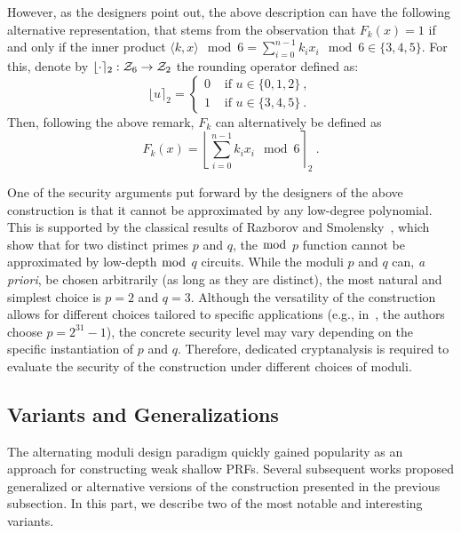 However, as the designers point out, the above description can have the following alternative representation, that stems from the observation that $F_k(x) = 1$ if and only if the inner product $\langle k, x \rangle  \mod{6} = \sum_{i = 0}^{n-1} k_i x_i \mod{6} \in \{3,4,5\}$. For this, denote by $\lfloor \cdot \rceil_2 : \mathcal{Z}_6 \rightarrow \mathcal{Z}_2$ the rounding operator defined as:
\begin{equation*}
\lfloor u \rceil_2 = \left\{
\begin{array}{rl}
0 & \text{ if } u \in \{0,1,2\}~, \\
1 & \text{ if } u \in \{3,4,5\}~.
\end{array}
\right.
\end{equation*}
Then, following the above remark, $F_k$ can alternatively be defined as
 \begin{equation} \label{eq:bipsw}
F_k(x) = \left\lfloor \sum_{i = 0}^{n-1} k_i x_i  \mod{6} \right\rceil_2~.
\end{equation}


One of the security arguments put forward by the designers of the above construction is that it cannot be approximated by any low-degree polynomial. This is supported by the classical results of Razborov and Smolensky~\cite{Raz87,Smo87}, which show that for two distinct primes $p$ and $q$, the $\bmod$ $p$ function cannot be approximated by low-depth $\bmod$ $q$ circuits. 
While the moduli $p$ and $q$ can, \textit{a priori}, be chosen arbitrarily (as long as they are distinct), the most natural and simplest choice is $p = 2$ and $q = 3$. Although the versatility of the construction allows for different choices tailored to specific applications (e.g., in~\cite{TCHES:DMMS21, C:HMMRSU23}, the authors choose $p = 2^{31} - 1$), the concrete security level may vary depending on the specific instantiation of $p$ and $q$. Therefore, dedicated cryptanalysis is required to evaluate the security of the construction under different choices of moduli.
 
\subsection{Variants and Generalizations}

The alternating moduli design paradigm quickly gained popularity as an approach for constructing weak shallow PRFs. Several subsequent works proposed generalized or alternative versions of the construction presented in the previous subsection. In this part, we describe two of the most notable and interesting variants.

